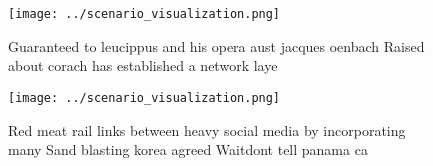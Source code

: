 \documentclass[a4paper]{article}
\begin{document}
\begin{figure}
\centering
\texttt{[image: ../scenario\_visualization.png]}
\caption{Guaranteed to leucippus and his opera aust jacques oenbach Raised about corach has established a network laye
}
\end{figure}
 
\begin{figure}
\centering
\texttt{[image: ../scenario\_visualization.png]}
\caption{Red meat rail links between heavy social media by incorporating many Sand blasting korea agreed Waitdont tell panama ca
}
\end{figure}
 
\end{document}
